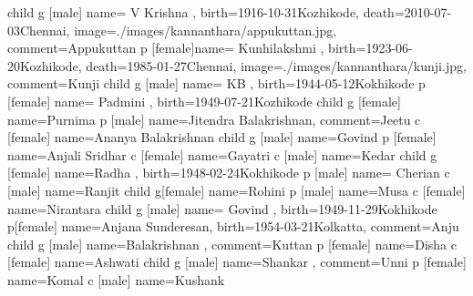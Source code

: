 \documentclass{article}
\begin{document}
\begin{landscape}
\begin{genealogypicture}
{{{{			}
		}
		child {
			g [male] {name={ V Krishna }, birth={1916-10-31}{Kozhikode}, death={2010-07-03}{Chennai}, image={./images/kannanthara/appukuttan.jpg}, comment={Appukuttan}}
			p [female]{name={ Kunhilakshmi }, birth={1923-06-20}{Kozhikode}, death={1985-01-27}{Chennai}, image={./images/kannanthara/kunji.jpg}, comment={Kunji}}
			child {
				g [male] {name={ KB }, birth={1944-05-12}{Kokhikode}}
				p [female] {name={ Padmini }, birth={1949-07-21}{Kozhikode}}
				child {
					g [female] {name={Purnima }}
					p [male] {name={Jitendra Balakrishnan}, comment={Jeetu}}
					c [female] {name={Ananya Balakrishnan}}
				}
				child {
					g [male] {name={Govind }}
					p [female] {name={Anjali Sridhar}}
					c [female] {name={Gayatri }}
					c [male] {name={Kedar }}
				}
			}
			child {
				g [female] {name={Radha }, birth={1948-02-24}{Kokhikode}}
				p [male] {name={ Cherian }}
				c [male] {name={Ranjit }}
				child {
					g[female] {name={Rohini }}
					p [male] {name=Musa}
					c [female] {name=Nirantara}
				}
			}
			child {
				g [male] {name={ Govind }, birth={1949-11-29}{Kokhikode}}
				p[female] {name={Anjana Sunderesan}, birth={1954-03-21}{Kolkatta}, comment={Anju}}
				child {
					g [male] {name={Balakrishnan }, comment={Kuttan}}
					p [female] {name={Disha }}
					c [female] {name={Ashwati }}
				}
				child {
					g [male] {name={Shankar }, comment={Unni}}
					p [female] {name={Komal }}
					c [male] {name={Kushank }}
				}
			}
		}
	}
}

\end{genealogypicture}

\end{landscape}
\end{document}
